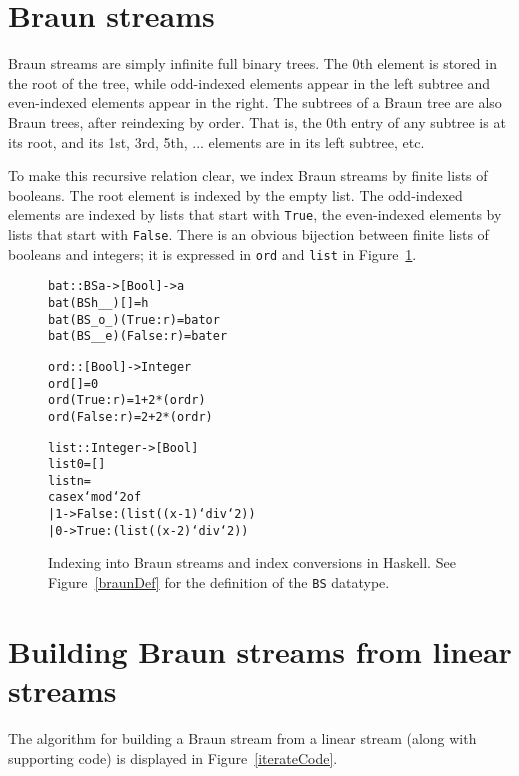 \documentclass{llncs}
\begin{document}
\section{Braun streams}

Braun streams are simply infinite full binary trees.
The $0$th element is stored in the root of the tree, while odd-indexed elements appear in the left subtree and even-indexed elements appear in the right.
The subtrees of a Braun tree are also Braun trees, after reindexing by order.
That is, the 0th entry of any subtree is at its root, and its 1st, 3rd, 5th, ... elements are in its left subtree, etc.

To make this recursive relation clear, we index Braun streams by finite lists of booleans.
The root element is indexed by the empty list.
The odd-indexed elements are indexed by lists that start with \verb|True|, the even-indexed elements by lists that start with \verb|False|.
There is an obvious bijection between finite lists of booleans and integers;
it is expressed in \verb|ord| and \verb|list| in Figure~\ref{basicCode}.

\begin{figure}
\begin{alltt}
bat :: BS a -> [Bool] -> a
bat (BS h _ _) [] = h
bat (BS _ o _) (True:r) = bat o r
bat (BS _ _ e) (False:r) = bat e r

ord :: [Bool] -> Integer
ord [] = 0
ord (True:r) = 1 + 2*(ord r)
ord (False:r) = 2 + 2*(ord r)

list :: Integer -> [Bool]
list 0 = []
list n = 
    case x `mod` 2 of
      | 1 -> False:(list ((x-1)`div`2))
      | 0 -> True:(list ((x-2)`div`2))
\end{alltt}
\caption{Indexing into Braun streams and index conversions in Haskell.
See Figure~\ref{braunDef} for the definition of the {\tt BS} datatype.}
\label{basicCode}
\end{figure}

\section{Building Braun streams from linear streams}

The algorithm for building a Braun stream from a linear stream (along with supporting code) is displayed in Figure~\ref{iterateCode}.
\end{document}

